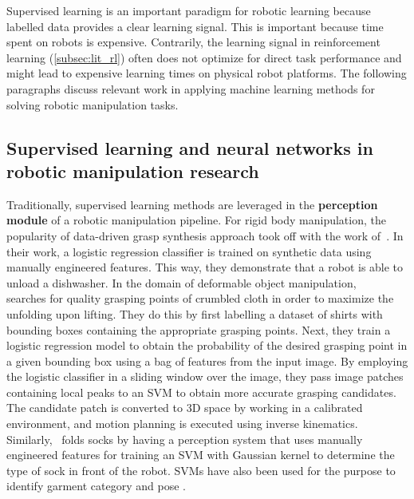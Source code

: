 \documentclass[\home/main.tex]{subfiles}
\begin{document}


Supervised learning is an important paradigm for robotic learning because labelled data provides a clear learning signal. This is important because time spent on robots is expensive. Contrarily, the learning signal in reinforcement learning (\cref{subsec:lit_rl}) often does not optimize for direct task performance and might lead to expensive learning times on physical robot platforms. The following paragraphs discuss relevant work in applying machine learning methods for solving robotic manipulation tasks. 

\subsection{Supervised learning and neural networks in robotic manipulation research}
Traditionally, supervised learning methods are leveraged in the \textbf{perception module} of a robotic manipulation pipeline. For rigid body manipulation, the popularity of data-driven grasp synthesis approach took off with the work of~\textcite{Saxena2008}. In their work, a logistic regression classifier is trained on synthetic data using manually engineered features. This way, they demonstrate that a robot is able to unload a dishwasher. In the domain of deformable object manipulation, ~\textcite{Ramisa2012} searches for quality grasping points of crumbled cloth in order to maximize the unfolding upon lifting. They do this by first labelling a dataset of shirts with bounding boxes containing the appropriate grasping points. Next, they train a logistic regression model to obtain the probability of the desired grasping point in a given bounding box using a bag of features from the input image. By employing the logistic classifier in a sliding window over the image, they pass image patches containing local peaks to an \gls{SVM} to obtain more accurate grasping candidates. The candidate patch is converted to 3D space by working in a calibrated environment, and motion planning is executed using inverse kinematics. Similarly,~\textcite{Wang2011} folds socks by having a perception system that uses manually engineered features for training an \gls{SVM} with Gaussian kernel to determine the type of sock in front of the robot. \Glspl{SVM} have also been used for the purpose to identify garment category and pose \autocite{Li2014, li2014volum}.
\end{document}
